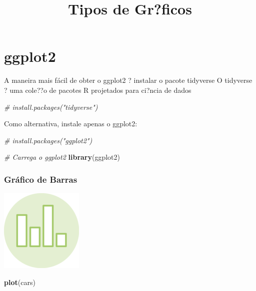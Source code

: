 \documentclass[]{article}
\title{Tipos de Gr?ficos}
\author{}
\date{}
\newenvironment{Shaded}{\begin{snugshade}}{\end{snugshade}}
\newcommand{\CommentTok}[1]{\textcolor[rgb]{0.56,0.35,0.01}{\textit{#1}}}
\newcommand{\KeywordTok}[1]{\textcolor[rgb]{0.13,0.29,0.53}{\textbf{#1}}}
\newcommand{\NormalTok}[1]{#1}
\begin{document}
\maketitle

\hypertarget{ggplot2}{%
\section{ggplot2}\label{ggplot2}}

A maneira mais fácil de obter o ggplot2 ? instalar o pacote tidyverse O
tidyverse ? uma cole??o de pacotes R projetados para ci?ncia de dados

\begin{Shaded}
\begin{Highlighting}[]
\CommentTok{# install.packages("tidyverse")}
\end{Highlighting}
\end{Shaded}

Como alternativa, instale apenas o ggplot2:

\begin{Shaded}
\begin{Highlighting}[]
\CommentTok{# install.packages("ggplot2")}
\end{Highlighting}
\end{Shaded}

\begin{Shaded}
\begin{Highlighting}[]
\CommentTok{# Carrega o ggplot2}
\KeywordTok{library}\NormalTok{(ggplot2)}
\end{Highlighting}
\end{Shaded}

\hypertarget{grafico-de-barras}{%
\subsubsection{Gráfico de Barras}\label{grafico-de-barras}}

\includegraphics{img/barchart.png}

\begin{Shaded}
\begin{Highlighting}[]
\KeywordTok{plot}\NormalTok{(cars)}
\end{Highlighting}
\end{Shaded}
\end{document}
